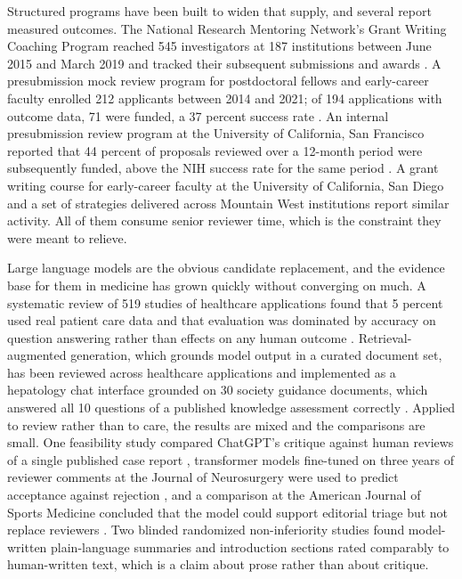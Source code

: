 \documentclass[11pt,a4paper]{article}
\begin{document}
Structured programs have been built to widen that supply, and several report measured outcomes. The National Research Mentoring Network's Grant Writing Coaching Program reached 545 investigators at 187 institutions between June 2015 and March 2019 and tracked their subsequent submissions and awards \cite{r3}. A presubmission mock review program for postdoctoral fellows and early-career faculty enrolled 212 applicants between 2014 and 2021; of 194 applications with outcome data, 71 were funded, a 37 percent success rate \cite{r4}. An internal presubmission review program at the University of California, San Francisco reported that 44 percent of proposals reviewed over a 12-month period were subsequently funded, above the NIH success rate for the same period \cite{r5}. A grant writing course for early-career faculty at the University of California, San Diego \cite{r6} and a set of strategies delivered across Mountain West institutions \cite{r7} report similar activity. All of them consume senior reviewer time, which is the constraint they were meant to relieve.

Large language models are the obvious candidate replacement, and the evidence base for them in medicine has grown quickly without converging on much. A systematic review of 519 studies of healthcare applications found that 5 percent used real patient care data and that evaluation was dominated by accuracy on question answering rather than effects on any human outcome \cite{r8}. Retrieval-augmented generation, which grounds model output in a curated document set, has been reviewed across healthcare applications \cite{r9} and implemented as a hepatology chat interface grounded on 30 society guidance documents, which answered all 10 questions of a published knowledge assessment correctly \cite{r10}. Applied to review rather than to care, the results are mixed and the comparisons are small. One feasibility study compared ChatGPT's critique against human reviews of a single published case report \cite{r11}, transformer models fine-tuned on three years of reviewer comments at the Journal of Neurosurgery were used to predict acceptance against rejection \cite{r12}, and a comparison at the American Journal of Sports Medicine concluded that the model could support editorial triage but not replace reviewers \cite{r13}. Two blinded randomized non-inferiority studies found model-written plain-language summaries \cite{r14} and introduction sections \cite{r15} rated comparably to human-written text, which is a claim about prose rather than about critique.
\end{document}
